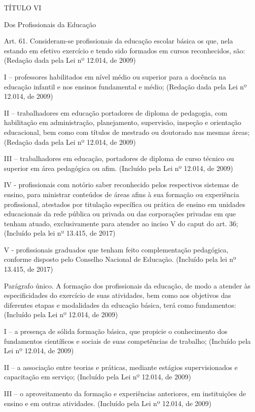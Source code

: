 \documentclass[
]{book}
\begin{document}
TÍTULO VI

Dos Profissionais da Educação

Art. 61. Consideram-se profissionais da educação escolar básica os que, nela estando em efetivo exercício e tendo sido formados em cursos reconhecidos, são: (Redação dada pela Lei nº 12.014, de 2009)

I -- professores habilitados em nível médio ou superior para a docência na educação infantil e nos ensinos fundamental e médio; (Redação dada pela Lei nº 12.014, de 2009)

II -- trabalhadores em educação portadores de diploma de pedagogia, com habilitação em administração, planejamento, supervisão, inspeção e orientação educacional, bem como com títulos de mestrado ou doutorado nas mesmas áreas; (Redação dada pela Lei nº 12.014, de 2009)

III -- trabalhadores em educação, portadores de diploma de curso técnico ou superior em área pedagógica ou afim. (Incluído pela Lei nº 12.014, de 2009)

IV - profissionais com notório saber reconhecido pelos respectivos sistemas de ensino, para ministrar conteúdos de áreas afins à sua formação ou experiência profissional, atestados por titulação específica ou prática de ensino em unidades educacionais da rede pública ou privada ou das corporações privadas em que tenham atuado, exclusivamente para atender ao inciso V do caput do art. 36; (Incluído pela lei nº 13.415, de 2017)

V - profissionais graduados que tenham feito complementação pedagógica, conforme disposto pelo Conselho Nacional de Educação. (Incluído pela lei nº 13.415, de 2017)

Parágrafo único. A formação dos profissionais da educação, de modo a atender às especificidades do exercício de suas atividades, bem como aos objetivos das diferentes etapas e modalidades da educação básica, terá como fundamentos: (Incluído pela Lei nº 12.014, de 2009)

I -- a presença de sólida formação básica, que propicie o conhecimento dos fundamentos científicos e sociais de suas competências de trabalho; (Incluído pela Lei nº 12.014, de 2009)

II -- a associação entre teorias e práticas, mediante estágios supervisionados e capacitação em serviço; (Incluído pela Lei nº 12.014, de 2009)

III -- o aproveitamento da formação e experiências anteriores, em instituições de ensino e em outras atividades. (Incluído pela Lei nº 12.014, de 2009)
\end{document}
